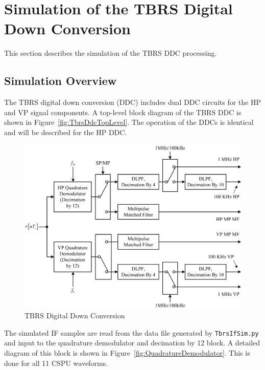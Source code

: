\documentclass[12pt,english]{article}
\begin{document}
\clearpage
\newpage{}
\section{Simulation of the TBRS Digital Down Conversion}\label{sec:tbrsDDC}

This section describes the simulation of the TBRS DDC processing.

\subsection{Simulation Overview}

The TBRS digital down conversion (DDC) includes dual DDC circuits for
the HP and VP signal components. A top-level block diagram of the TBRS
DDC is shown in Figure~\vref{fig:TbrsDdcTopLevel}. The operation of
the DDCs is identical and will be described for the HP DDC.

\begin{figure}
  \noindent \begin{centering}
  \includegraphics{TbrsDdcTopLevel.png}\medskip{}
  \caption{TBRS Digital Down Conversion}
  \label{fig:TbrsDdcTopLevel}
  \par \end{centering}
\end{figure}

The simulated IF samples are read from the data file generated by
\texttt{TbrsIfSim.py} and input to the quadrature demodulator and
decimation by 12 block. A detailed diagram of this block is shown in
Figure~\vref{fig:QuadratureDemodulator}. This is done for all 11 CSPU
waveforms.
\end{document}
